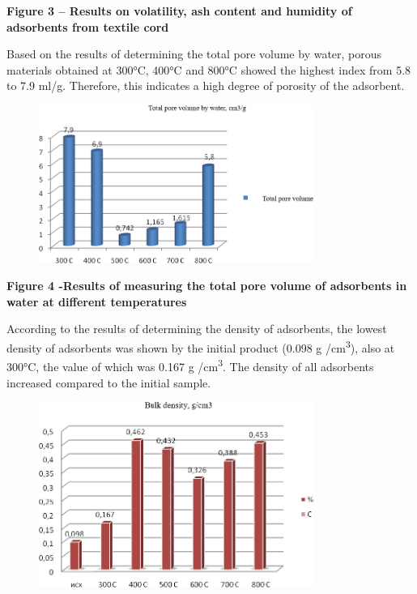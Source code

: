 \textbf{Figure 3 -- Results on volatility, ash content and humidity of
adsorbents from textile cord}

Based on the results of determining the total pore volume by water,
porous materials obtained at 300°C, 400°C and 800°C showed the highest
index from 5.8 to 7.9 ml/g. Therefore, this indicates a high degree of
porosity of the adsorbent.

\begin{figure}[H]
	\centering
	\includegraphics[width=0.8\textwidth]{assets/1007}
	\caption*{}
\end{figure}

\textbf{Figure 4 -Results of measuring the total pore volume of
adsorbents in water at different temperatures}

According to the results of determining the density of adsorbents, the
lowest density of adsorbents was shown by the initial product (0.098 g
/cm\textsuperscript{3}), also at 300°C, the value of which was 0.167 g
/cm\textsuperscript{3}. The density of all adsorbents increased compared
to the initial sample.

\begin{figure}[H]
	\centering
	\includegraphics[width=0.8\textwidth]{assets/1008}
	\caption*{}
\end{figure}

